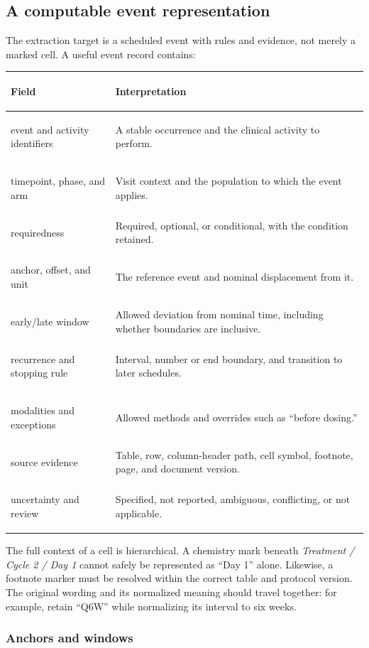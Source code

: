 \documentclass[12pt,oneside]{book}
\numberwithin{equation}{section}
\theoremstyle{definition}
\theoremstyle{plain}
\theoremstyle{remark}
\begin{document}
\subsection{A computable event representation}

The extraction target is a scheduled event with rules and evidence, not merely
a marked cell.  A useful event record contains:
\begin{center}
\begin{xltabular}{0.94\textwidth}{>{\bfseries\raggedright\arraybackslash}p{0.25\textwidth}X}
\toprule
Field & Interpretation \\
\midrule
event and activity identifiers & A stable occurrence and the clinical activity to perform. \\
timepoint, phase, and arm & Visit context and the population to which the event applies. \\
requiredness & Required, optional, or conditional, with the condition retained. \\
anchor, offset, and unit & The reference event and nominal displacement from it. \\
early/late window & Allowed deviation from nominal time, including whether boundaries are inclusive. \\
recurrence and stopping rule & Interval, number or end boundary, and transition to later schedules. \\
modalities and exceptions & Allowed methods and overrides such as ``before dosing.'' \\
source evidence & Table, row, column-header path, cell symbol, footnote, page, and document version. \\
uncertainty and review & Specified, not reported, ambiguous, conflicting, or not applicable. \\
\bottomrule
\end{xltabular}
\end{center}

The full context of a cell is hierarchical.  A chemistry mark beneath
\emph{Treatment / Cycle 2 / Day 1} cannot safely be represented as ``Day 1''
alone.  Likewise, a footnote marker must be resolved within the correct table
and protocol version.  The original wording and its normalized meaning should
travel together: for example, retain ``Q6W'' while normalizing its interval to
six weeks.

\subsubsection{Anchors and windows}
\end{document}

